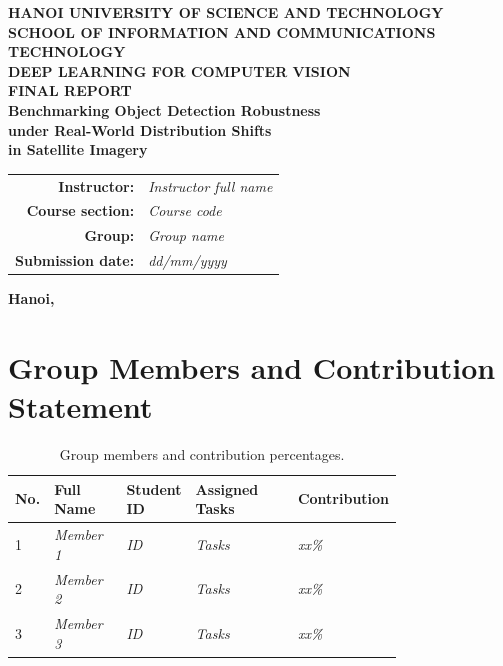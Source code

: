 \documentclass[12pt,a4paper]{article}
\newcommand{\todo}[1]{{\color{black}\itshape #1}}
\begin{document}
\begin{titlepage}
    \centering
    \vspace*{0.5cm}
    {\Large \textbf{HANOI UNIVERSITY OF SCIENCE AND TECHNOLOGY}}\\[0.1cm]
    {\Large \textbf{SCHOOL OF INFORMATION AND COMMUNICATIONS TECHNOLOGY}}\\[0.3cm]
    {\large \textbf{DEEP LEARNING FOR COMPUTER VISION}}\\[1.5cm]

    {\Huge \textbf{FINAL REPORT}}\\[0.7cm]
    {\LARGE \textbf{Benchmarking Object Detection Robustness}}\\[0.2cm]
    {\LARGE \textbf{under Real-World Distribution Shifts}}\\[0.2cm]
    {\LARGE \textbf{in Satellite Imagery}}\\[1.5cm]

    \begin{tabular}{rl}
        \textbf{Instructor:} & \todo{Instructor full name} \\
        \textbf{Course section:} & \todo{Course code} \\
        \textbf{Group:} & \todo{Group name} \\
        \textbf{Submission date:} & \todo{dd/mm/yyyy} \\
    \end{tabular}

    \vfill
    {\large \textbf{Hanoi, \the\year}}
\end{titlepage}

\section*{Group Members and Contribution Statement}

\begin{table}[H]
\centering
\small
\caption{Group members and contribution percentages.}
\label{tab:member_contribution}
\begin{tabular}{p{0.02\linewidth}p{0.2\linewidth}p{0.15\linewidth}p{0.30\linewidth}p{0.10\linewidth}}
\toprule
\textbf{No.} & \textbf{Full Name} & \textbf{Student ID} & \textbf{Assigned Tasks} & \textbf{Contribution} \\
\midrule
1 & \todo{Member 1} & \todo{ID} & \todo{Tasks} & \todo{xx\%} \\
2 & \todo{Member 2} & \todo{ID} & \todo{Tasks} & \todo{xx\%} \\
3 & \todo{Member 3} & \todo{ID} & \todo{Tasks} & \todo{xx\%} \\
\bottomrule
\end{tabular}
\end{table}
\end{document}
